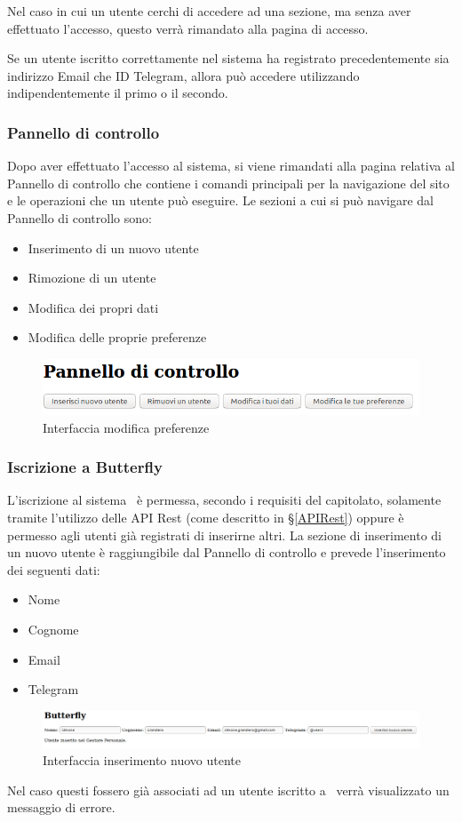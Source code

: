 Nel caso in cui un utente cerchi di accedere ad una sezione, ma senza aver effettuato l'accesso, questo verrà rimandato alla pagina di accesso.\par
Se un utente iscritto correttamente nel sistema ha registrato precedentemente sia indirizzo Email che ID Telegram, allora può accedere utilizzando indipendentemente il primo o il secondo.

\subsubsection{Pannello di controllo}
Dopo aver effettuato l'accesso al sistema, si viene rimandati alla pagina relativa al Pannello di controllo che contiene i comandi principali per la navigazione del sito e le operazioni che un utente può eseguire.
Le sezioni a cui si può navigare dal Pannello di controllo sono:
\begin{itemize}
	\item Inserimento di un nuovo utente
	\item Rimozione di un utente
	\item Modifica dei propri dati
	\item Modifica delle proprie preferenze
\end{itemize}
\begin{figure}[H]
	\centering
	\includegraphics[width=14cm]{img/pannello_1.png}
	\caption{Interfaccia modifica preferenze}
\end{figure}

\subsubsection{Iscrizione a Butterfly}
L'iscrizione al sistema \progetto\ è permessa, secondo i requisiti del capitolato, solamente tramite l'utilizzo delle API Rest (come descritto in \S\ref{APIRest}) oppure è permesso agli utenti già registrati di inserirne altri.
La sezione di inserimento di un nuovo utente è raggiungibile dal Pannello di controllo e prevede l'inserimento dei seguenti dati:
\begin{itemize}
	\item Nome
	\item Cognome
	\item Email
	\item Telegram
\end{itemize}
\begin{figure}[H]
	\centering
	\includegraphics[width=\textwidth]{img/inserimento_1.png}
	\caption{Interfaccia inserimento nuovo utente}
\end{figure}
Nel caso questi fossero già associati ad un utente iscritto a \progetto\ verrà visualizzato un messaggio di errore.

